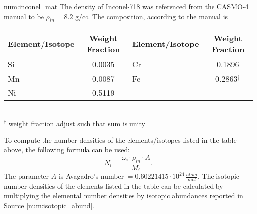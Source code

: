 \begin{numitem}{num:inconel_mat}
   The density of Inconel-718 was referenced from the CASMO-4 manual to be $\rho_{in} = 8.2$ g/cc.  The composition, according to the manual is
 \begin{center}
  \begin{tabular}{l c l c}
    \toprule
    Element/Isotope & Weight Fraction & Element/Isotope & Weight Fraction \\
    \midrule
    \midrule
Si   &  0.0035  &  Cr  &   0.1896 \\
Mn   &  0.0087  &  Fe  &   0.2863$^\dagger$   \\
Ni   &  0.5119  &   &    \\
    \bottomrule
  \end{tabular}
  \\$^\dagger$ weight fraction adjust such that sum is unity
 \end{center}

To compute the number densities of the elements/isotopes listed in the table above, the following formula can be used:
\[
    N_i = \frac{\omega_i\cdot\rho_{in}\cdot A}{M_i}.
\]
The parameter $A$ is Avagadro's number $=0.60221415\cdot 10^{24}\,\frac{atom}{mol}$. The isotopic number densities of the elements listed in the table can be calculated by multiplying the elemental number densities by isotopic abundances reported in Source \ref{num:isotopic_abund}.


\end{numitem}

